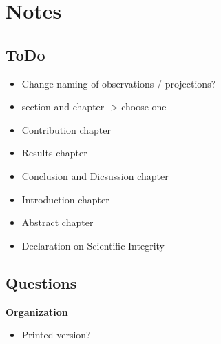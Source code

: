 \chapter{Notes}

\section{ToDo}
\begin{itemize}
    \item Change naming of observations / projections?
    \item section and chapter -> choose one
    \item Contribution chapter
    \item Results chapter
    \item Conclusion and Dicsussion chapter
    \item Introduction chapter
    \item Abstract chapter
    \item Declaration on Scientific Integrity
\end{itemize}

\section{Questions}

\textbf{Organization}
\begin{itemize}
    \item Printed version?
\end{itemize}

\clearpage

